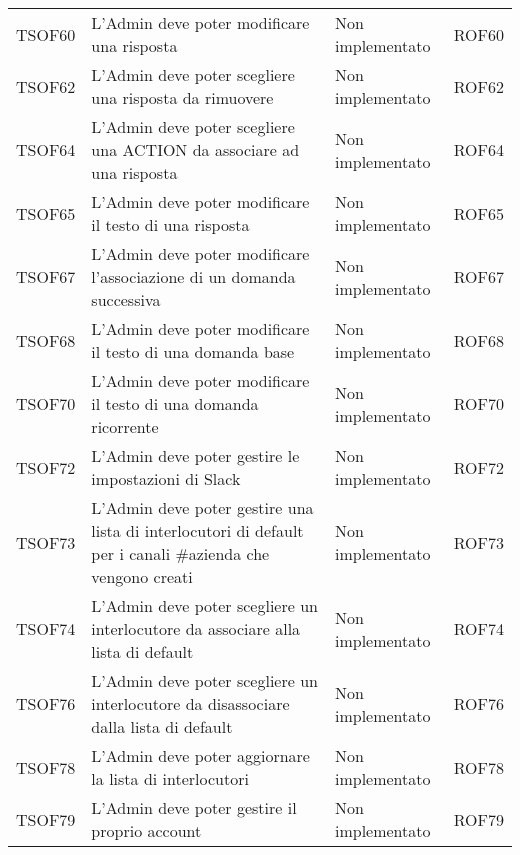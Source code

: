 \documentclass[../PianoDiQualifica.tex]{subfiles}
\begin{document}
\begin{longtable}[c] { >{\centering\arraybackslash}p{2cm} p{7cm} >{\centering\arraybackslash}p{4cm} >{\centering\arraybackslash}p{2cm}}
			\addlinespace[0.3em]
			\midrule
			\addlinespace[0.3em]
			TSOF60 & L'Admin deve poter modificare una risposta & Non implementato & ROF60 \\
			\addlinespace[0.3em]
			\midrule
			\addlinespace[0.3em] 
			TSOF62 & L'Admin deve poter scegliere una risposta da rimuovere & Non implementato & ROF62 \\ 
			\addlinespace[0.3em]
			\midrule
			\addlinespace[0.3em]
			TSOF64 & L'Admin deve poter scegliere una ACTION da associare ad una risposta & Non implementato & ROF64 \\ 
			\addlinespace[0.3em]
			\midrule
			\addlinespace[0.3em]
			TSOF65 & L'Admin deve poter modificare il testo di una risposta & Non implementato & ROF65 \\ 
			\addlinespace[0.3em]
			\midrule
			\addlinespace[0.3em]
			TSOF67 & L'Admin deve poter modificare l'associazione di un domanda successiva	 & Non implementato & ROF67 \\ 
			\addlinespace[0.3em]
			\midrule
			\addlinespace[0.3em]
			TSOF68 & L'Admin deve poter modificare il testo di una domanda base & Non implementato & ROF68 \\ 
			\addlinespace[0.3em]
			\midrule
			\addlinespace[0.3em]
			TSOF70 & L'Admin deve poter modificare il testo di una domanda ricorrente & Non implementato & ROF70 \\ 
			\addlinespace[0.3em]
			\midrule
			\addlinespace[0.3em]
			TSOF72 & L'Admin deve poter gestire le impostazioni di Slack & Non implementato & ROF72 \\ 
			\addlinespace[0.3em]
			\midrule
			\addlinespace[0.3em]
			TSOF73 & L'Admin deve poter gestire una lista di interlocutori di default per i canali \#azienda che vengono creati & Non implementato & ROF73 \\ 
			\addlinespace[0.3em]
			\midrule
			\addlinespace[0.3em]
			TSOF74 & L'Admin deve poter scegliere un interlocutore da associare alla lista di default	& Non implementato & ROF74 \\ 
			\addlinespace[0.3em]
			\midrule
			\addlinespace[0.3em]
			TSOF76 & L'Admin deve poter scegliere un interlocutore da disassociare dalla lista di default & Non implementato & ROF76 \\
			\addlinespace[0.3em]
			\midrule
			\addlinespace[0.3em] 
			TSOF78 & L'Admin deve poter aggiornare la lista di interlocutori & Non implementato & ROF78 \\ 
			\addlinespace[0.3em]
			\midrule
			\addlinespace[0.3em]
			TSOF79 & L'Admin deve poter gestire il proprio account & Non implementato & ROF79 \\ 

\end{longtable}
\end{document}
